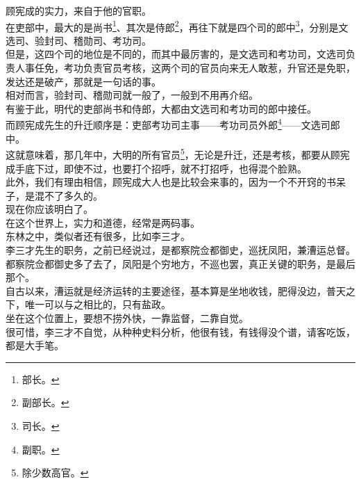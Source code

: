 \begin{multicols}{\theparacolNo}
顾宪成的实力，来自于他的官职。\\

在吏部中，最大的是尚书\footnote{部长。}、其次是侍郎\footnote{副部长。}，再往下就是四个司的郎中\footnote{司长。}，分别是文选司、验封司、稽勋司、考功司。\\

但是，这四个司的地位是不同的，而其中最厉害的，是文选司和考功司，文选司负责人事任免，考功负责官员考核，这两个司的官员向来无人敢惹，升官还是免职，发达还是破产，那就是一句话的事。\\

相对而言，验封司、稽勋司就一般了，一般到不用再介绍。\\

有鉴于此，明代的吏部尚书和侍郎，大都由文选司和考功司的郎中接任。\\

而顾宪成先生的升迁顺序是：吏部考功司主事——考功司员外郎\footnote{副职。}——文选司郎中。\\

这就意味着，那几年中，大明的所有官员\footnote{除少数高官。}，无论是升迁，还是考核，都要从顾宪成手底下过，即使不过，也要打个招呼，就不打招呼，也得混个脸熟。\\

此外，我们有理由相信，顾宪成大人也是比较会来事的，因为一个不开窍的书呆子，是混不了多久的。\\

现在你应该明白了。\\

在这个世界上，实力和道德，经常是两码事。\\

东林之中，类似者还有很多，比如李三才。\\

李三才先生的职务，之前已经说过，是都察院佥都御史，巡抚凤阳，兼漕运总督。\\

都察院佥都御史多了去了，凤阳是个穷地方，不巡也罢，真正关键的职务，是最后那个。\\

自古以来，漕运就是经济运转的主要途径，基本算是坐地收钱，肥得没边，普天之下，唯一可以与之相比的，只有盐政。\\

坐在这个位置上，要想不捞外快，一靠监督，二靠自觉。\\

很可惜，李三才不自觉，从种种史料分析，他很有钱，有钱得没个谱，请客吃饭，都是大手笔。\\


\end{multicols}
